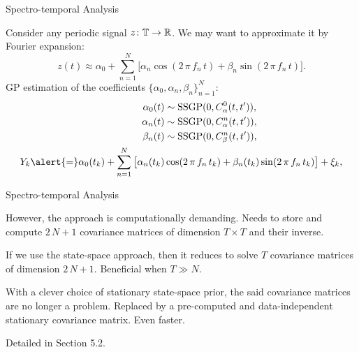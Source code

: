 \documentclass[seriffont, cmap=Beijing, 10pt]{zz}
\begin{document}
\begin{frame}{Spectro-temporal Analysis}
	\begin{block}{}
		Consider any periodic signal $z\colon\mathbb{T}\to\mathbb{R}$. We may want to approximate it by \alert{Fourier expansion}:
		\begin{equation}
			z(t) \approx \alpha_0 + \sum^N_{n=1} \big[ \alpha_n \cos(2 \, \pi \, f_n \, t) + \beta_n\sin(2 \, \pi \, f_n \, t) \big].
		\end{equation}
		\alert{GP estimation} of the coefficients \alert{$\lbrace \alpha_0, \alpha_n,\beta_n \rbrace_{n=1}^N$}:
		\begin{equation}
		\begin{split}
		\alpha_0(t) &\sim \mathrm{SSGP}(0, C^0_\alpha(t, t')), \\
		\alpha_n(t) &\sim \mathrm{SSGP}(0, C^n_\alpha(t, t')), \\
		\beta_n(t) &\sim \mathrm{SSGP}(0, C^n_\beta(t, t')), \\
		Y_k \alert{=} \alpha_0(t_k) + \sum^N_{n=1} \big[ \alpha_n(t_k) &\cos(2 \, \pi \, f_n \, t_k) + \beta_n(t_k)\sin(2 \, \pi \, f_n \, t_k) \big] + \xi_k,\nonumber
		\end{split}
		\end{equation}
	\end{block}
\end{frame}

\begin{frame}{Spectro-temporal Analysis}
	\begin{block}{}
		However, the approach is \alert{computationally demanding}. Needs to store and compute \alert{$2 \, N+1$} covariance matrices of dimension \alert{$T\times T$} and their \alert{inverse}.
	\end{block}
	\begin{block}{}
		If we use the state-space approach, then it reduces to solve \alert{$T$} covariance matrices of dimension \alert{$2 \, N+1$}. Beneficial when \alert{$T\gg N$}.
	\end{block}
	\begin{block}{}
		With a clever choice of \alert{stationary} state-space prior, the said covariance matrices are no longer a problem. Replaced by a \alert{pre-computed and data-independent} stationary covariance matrix. Even faster.
	\end{block}
	\begin{block}{}
		Detailed in \alert{Section 5.2}.
	\end{block}
\end{frame}
\end{document}
